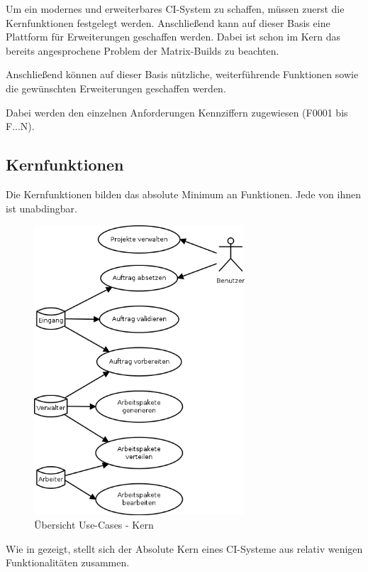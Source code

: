 Um ein modernes und erweiterbares CI-System zu schaffen,
müssen zuerst die Kernfunktionen festgelegt werden.
Anschließend kann auf dieser Basis
eine Plattform für Erweiterungen geschaffen werden.
Dabei ist schon im Kern das bereits angesprochene Problem
der Matrix-Builds zu beachten.

Anschließend können auf dieser Basis nützliche, weiterführende Funktionen
sowie die gewünschten Erweiterungen geschaffen werden.

Dabei werden den einzelnen Anforderungen Kennziffern zugewiesen (F0001 bis F...N).

\subsection{Kernfunktionen}

Die Kernfunktionen bilden das absolute Minimum an Funktionen.
Jede von ihnen ist unabdingbar.

\begin{figure}[ht]
  \centering
  \includegraphics[width=0.7\textwidth]{imageinput/use-case-muss.png}
  \caption{\"Ubersicht Use-Cases - Kern}
  \label{fig:use-case-muss}
\end{figure}

Wie in  gezeigt,
stellt sich der Absolute Kern eines CI-Systeme aus relativ wenigen Funktionalitäten zusammen.

